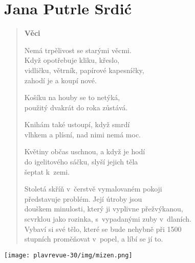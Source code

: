 \section{Jana Putrle Srdić}

\begin{verse}

\textbf{Věci}

\medskip

Nemá trpělivost se starými věcmi. \\
Když opotřebuje kliku, křeslo, \\
vidličku, větrník, papírové kapesníčky, \\
zahodí je a koupí nové. \\

\medskip

Košíku na houby se to netýká, \\
použitý dvakrát do roka zůstává. \\

\medskip

Knihám také ustoupí, když smrdí \\
vlhkem a plísní, nad nimi nemá moc. \\

\medskip

Květiny občas uschnou, a když je hodí \\
do igelitového sáčku, slyší jejich těla \\
šeptat k~zemi. \\

\medskip

Stoletá skříň v~čerstvě vymalovaném pokoji \\
představuje problém. Její útroby jsou \\
douškem minulosti, který ji vyplivne přežvýkanou, \\
scvrklou jako rozinka, s~vypadanými zuby v~dlaních. \\
Vybaví si své tělo, které se bude nehybně při 1500  \\
stupních proměňovat v~popel, a líbí se jí to. \\

\end{verse}


\begin{center}
\texttt{[image: plavrevue-30/img/mizen.png]}
\end{center}
